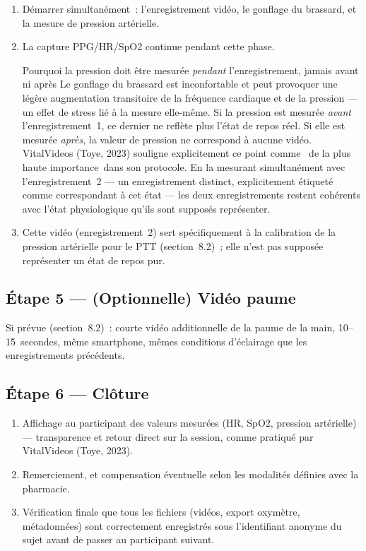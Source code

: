 \documentclass[11pt,a4paper]{article}
\begin{document}
\begin{enumerate}
\item D\'emarrer simultan\'ement~: l'enregistrement vid\'eo, le gonflage du
brassard, et la mesure de pression art\'erielle.
\item La capture PPG/HR/SpO2 continue pendant cette phase.

\begin{warnbox}{Pourquoi la pression doit \^etre mesur\'ee \emph{pendant}
l'enregistrement, jamais avant ni apr\`es}
Le gonflage du brassard est inconfortable et peut provoquer une l\'eg\`ere
augmentation transitoire de la fr\'equence cardiaque et de la pression ---
un effet de stress li\'e \`a la mesure elle-m\^eme. Si la pression est
mesur\'ee \emph{avant} l'enregistrement~1, ce dernier ne refl\`ete plus
l'\'etat de repos r\'eel. Si elle est mesur\'ee \emph{apr\`es}, la valeur de
pression ne correspond \`a aucune vid\'eo. VitalVideos (Toye, 2023) souligne
explicitement ce point comme \guillemotleft~de la plus haute
importance\guillemotright\ dans son protocole. En la mesurant
simultan\'ement avec l'enregistrement~2 --- un enregistrement distinct,
explicitement \'etiquet\'e comme correspondant \`a cet \'etat --- les deux
enregistrements restent coh\'erents avec l'\'etat physiologique qu'ils sont
suppos\'es repr\'esenter.
\end{warnbox}

\item Cette vid\'eo (enregistrement~2) sert sp\'ecifiquement \`a la
calibration de la pression art\'erielle pour le PTT (section~8.2)~; elle
n'est pas suppos\'ee repr\'esenter un \'etat de repos pur.
\end{enumerate}

\subsection{\'Etape 5 --- (Optionnelle) Vid\'eo paume}

Si pr\'evue (section~8.2)~: courte vid\'eo additionnelle de la paume de la
main, 10--15~secondes, m\^eme smartphone, m\^emes conditions d'\'eclairage
que les enregistrements pr\'ec\'edents.

\subsection{\'Etape 6 --- Cl\^oture}

\begin{enumerate}
\item Affichage au participant des valeurs mesur\'ees (HR, SpO2, pression
art\'erielle) --- transparence et retour direct sur la session, comme
pratiqu\'e par VitalVideos (Toye, 2023).
\item Remerciement, et compensation \'eventuelle selon les modalit\'es
d\'efinies avec la pharmacie.
\item V\'erification finale que tous les fichiers (vid\'eos, export
oxym\`etre, m\'etadonn\'ees) sont correctement enregistr\'es sous
l'identifiant anonyme du sujet avant de passer au participant suivant.
\end{enumerate}
\end{document}
